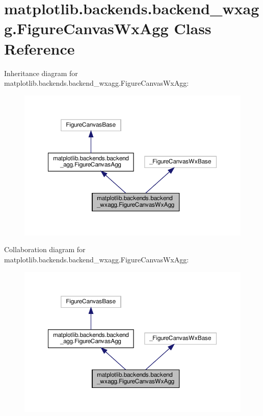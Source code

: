 \hypertarget{classmatplotlib_1_1backends_1_1backend__wxagg_1_1FigureCanvasWxAgg}{}\section{matplotlib.\+backends.\+backend\+\_\+wxagg.\+Figure\+Canvas\+Wx\+Agg Class Reference}
\label{classmatplotlib_1_1backends_1_1backend__wxagg_1_1FigureCanvasWxAgg}


Inheritance diagram for matplotlib.\+backends.\+backend\+\_\+wxagg.\+Figure\+Canvas\+Wx\+Agg\+:
\nopagebreak
\begin{figure}[H]
\begin{center}
\leavevmode
\includegraphics[width=350pt]{classmatplotlib_1_1backends_1_1backend__wxagg_1_1FigureCanvasWxAgg__inherit__graph}
\end{center}
\end{figure}


Collaboration diagram for matplotlib.\+backends.\+backend\+\_\+wxagg.\+Figure\+Canvas\+Wx\+Agg\+:
\nopagebreak
\begin{figure}[H]
\begin{center}
\leavevmode
\includegraphics[width=350pt]{classmatplotlib_1_1backends_1_1backend__wxagg_1_1FigureCanvasWxAgg__coll__graph}
\end{center}
\end{figure}
